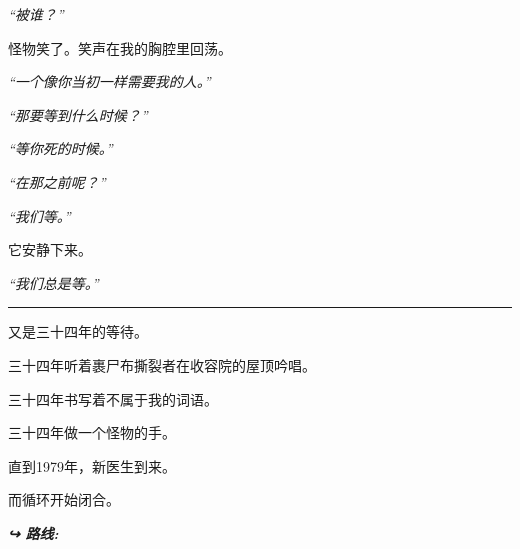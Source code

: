 \noindent \textit{“被谁？”}

\noindent 怪物笑了。笑声在我的胸腔里回荡。

\noindent \textit{“一个像你当初一样需要我的人。”}

\noindent \textit{“那要等到什么时候？”}

\noindent \textit{“等你死的时候。”}

\noindent \textit{“在那之前呢？”}

\noindent \textit{“我们等。”}

\noindent 它安静下来。

\noindent \textit{“我们总是等。”}

\vspace{0.5em}\noindent\rule{\textwidth}{0.5pt}\vspace{0.5em}

\noindent 又是三十四年的等待。

\noindent 三十四年听着裹尸布撕裂者在收容院的屋顶吟唱。

\noindent 三十四年书写着不属于我的词语。

\noindent 三十四年做一个怪物的手。

\noindent 直到1979年，新医生到来。

\noindent 而循环开始闭合。

\vspace{0.5em}
\noindent\textit{\textbf{↪ 路线:}  \rotasep {} \rotasep {}}
